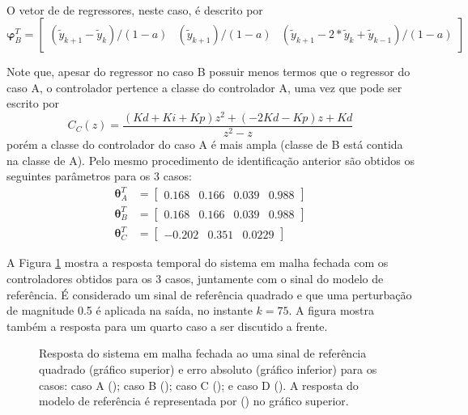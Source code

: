 \begin{exmp}
\begin{description}
\begin{align}
            \label{eq:} 
         \end{align}
         O vetor de de regressores, neste caso, é descrito por
         \begin{equation}
            \bm{\varphi}^T_B = \begin{bmatrix} 
               (\tilde{y}_{k+1}-\tilde{y}_k)/(1-a) &
               (\tilde{y}_{k+1})/(1-a) &
               (\tilde{y}_{k+1}-2*\tilde{y}_k+\tilde{y}_{k-1})/(1-a)
            \end{bmatrix} 
            \label{eq:}
         \end{equation}
   \end{description}
   Note que, apesar do regressor no caso B possuir menos termos que o regressor do caso A, o controlador pertence a classe do controlador A, uma vez que pode ser escrito por
   \begin{equation*}
      C_C(z) = \frac{(Kd + Ki + Kp)z^2 + (- 2Kd - Kp)z + Kd}{z^2 - z}
   \end{equation*}
   porém a classe do controlador do caso A é mais ampla (classe de B está contida na classe de A).
   Pelo mesmo procedimento de identificação  anterior são obtidos os seguintes parâmetros para os 3 casos:
   \begin{align}
      \label{eq:ex31_par3casos}
      \bm{\theta}_A^T &= \begin{bmatrix}   0.168 & 0.166 & 0.039 & 0.988 \end{bmatrix} \nonumber \\
      \bm{\theta}_B^T &= \begin{bmatrix}   0.168 & 0.166 & 0.039 & 0.988 \end{bmatrix} \nonumber \\
      \bm{\theta}_C^T &= \begin{bmatrix}   -0.202 & 0.351 & 0.0229 \end{bmatrix} \nonumber 
   \end{align}
   
   A Figura \ref{fig:exp31_time_resp} mostra a resposta temporal do sistema em malha fechada com os controladores obtidos para os 3 casos, juntamente com o sinal do modelo de referência. É considerado um sinal de referência quadrado e que uma perturbação de magnitude 0.5 é aplicada na saída, no instante $k=75$. A figura mostra também a resposta para um quarto caso a ser discutido a frente.
   \begin{figure}[htpb]
          
      \footnotesize
      \centering
      \hspace*{-1.2cm}
      
      \caption{Resposta do sistema em malha fechada ao uma sinal de referência quadrado (gráfico superior) e erro absoluto (gráfico inferior) para os casos: caso A (); caso B (); caso C (); e caso D (). A resposta do modelo de referência é representada por  () no gráfico superior.}
      \label{fig:exp31_time_resp}
   \end{figure}


\end{exmp}
